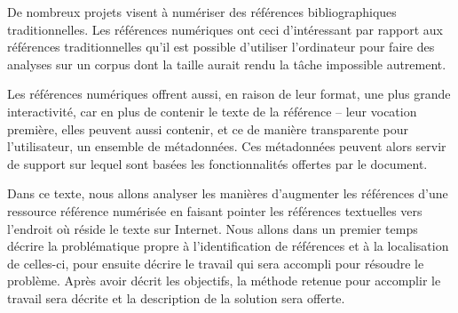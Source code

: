 De nombreux projets visent à numériser des références bibliographiques traditionnelles. Les références numériques ont ceci d'intéressant par rapport aux références traditionnelles qu'il est possible d'utiliser l'ordinateur pour faire des analyses sur un corpus dont la taille aurait rendu la tâche impossible autrement.

Les références numériques offrent aussi, en raison de leur format, une plus grande interactivité, car en plus de contenir le texte de la référence -- leur vocation première, elles peuvent aussi contenir, et ce de manière transparente pour l'utilisateur, un ensemble de métadonnées. Ces métadonnées peuvent alors servir de support sur lequel sont basées les fonctionnalités offertes par le document.

Dans ce texte, nous allons analyser les manières d'augmenter les références d'une ressource référence numérisée en faisant pointer les références textuelles vers l'endroit où réside le texte sur Internet. Nous allons dans un premier temps décrire la problématique propre à l'identification de références et à la localisation de celles-ci, pour ensuite décrire le travail qui sera accompli pour résoudre le problème. Après avoir décrit les objectifs, la méthode retenue pour accomplir le travail sera décrite et la description de la solution sera offerte.
